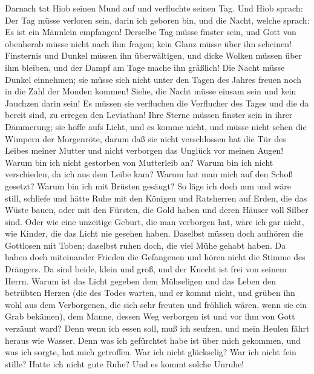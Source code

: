  Darnach tat Hiob seinen Mund auf und verfluchte seinen Tag.
 Und Hiob sprach:  Der Tag müsse verloren sein,
darin ich geboren bin, und die Nacht, welche sprach: Es ist ein Männlein
empfangen!  Derselbe Tag müsse finster sein, und Gott von
obenherab müsse nicht nach ihm fragen; kein Glanz müsse über ihn
scheinen!  Finsternis und Dunkel müssen ihn überwältigen,
und dicke Wolken müssen über ihm bleiben, und der Dampf am Tage mache
ihn gräßlich!  Die Nacht müsse Dunkel einnehmen; sie müsse
sich nicht unter den Tagen des Jahres freuen noch in die Zahl der Monden
kommen!  Siehe, die Nacht müsse einsam sein und kein
Jauchzen darin sein!  Es müssen sie verfluchen die
Verflucher des Tages und die da bereit sind, zu erregen den Leviathan!
 Ihre Sterne müssen finster sein in ihrer Dämmerung; sie
hoffe aufs Licht, und es komme nicht, und müsse nicht sehen die Wimpern
der Morgenröte,  darum daß sie nicht verschlossen hat die
Tür des Leibes meiner Mutter und nicht verborgen das Unglück vor meinen
Augen!  Warum bin ich nicht gestorben von Mutterleib an?
Warum bin ich nicht verschieden, da ich aus dem Leibe kam? 
Warum hat man mich auf den Schoß gesetzt? Warum bin ich mit Brüsten
gesäugt?  So läge ich doch nun und wäre still, schliefe und
hätte Ruhe  mit den Königen und Ratsherren auf Erden, die
das Wüste bauen,  oder mit den Fürsten, die Gold haben und
deren Häuser voll Silber sind.  Oder wie eine unzeitige
Geburt, die man verborgen hat, wäre ich gar nicht, wie Kinder, die das
Licht nie gesehen haben.  Daselbst müssen doch aufhören die
Gottlosen mit Toben; daselbst ruhen doch, die viel Mühe gehabt haben.
 Da haben doch miteinander Frieden die Gefangenen und hören
nicht die Stimme des Drängers.  Da sind beide, klein und
groß, und der Knecht ist frei von seinem Herrn.  Warum ist
das Licht gegeben dem Mühseligen und das Leben den betrübten Herzen
 (die des Todes warten, und er kommt nicht, und grüben ihn
wohl aus dem Verborgenen,  die sich sehr freuten und
fröhlich wären, wenn sie ein Grab bekämen),  dem Manne,
dessen Weg verborgen ist und vor ihm von Gott verzäunt ward?
 Denn wenn ich essen soll, muß ich seufzen, und mein Heulen
fährt heraus wie Wasser.  Denn was ich gefürchtet habe ist
über mich gekommen, und was ich sorgte, hat mich getroffen.
 War ich nicht glückselig? War ich nicht fein stille? Hatte
ich nicht gute Ruhe? Und es kommt solche Unruhe!

